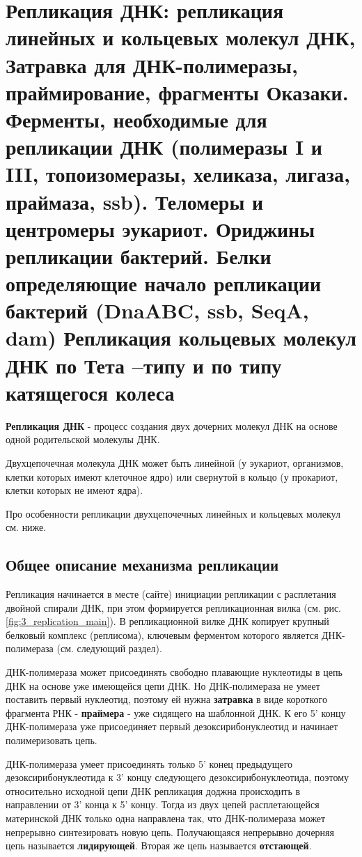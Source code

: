 \section{Репликация ДНК: репликация линейных и кольцевых молекул ДНК, 
Затравка для ДНК-полимеразы, праймирование, фрагменты Оказаки. 
Ферменты, необходимые для репликации ДНК (полимеразы I и III, топоизомеразы, хеликаза, лигаза, 
праймаза, ssb). 
Теломеры и центромеры эукариот. Ориджины репликации бактерий. Белки определяющие начало 
репликации бактерий (DnaABC, ssb, SeqA, dam) Репликация кольцевых молекул ДНК по Тета –типу и по типу катящегося колеса}


\textbf{Репликация ДНК} - процесс создания двух дочерних молекул ДНК на основе одной родительской молекулы ДНК. 

Двухцепочечная молекула ДНК может быть линейной (у эукариот, организмов, клетки которых имеют  клеточное ядро) или свернутой в кольцо (у прокариот, клетки которых не имеют ядра). 

Про особенности репликации двухцепочечных линейных и кольцевых молекул см. ниже.

\subsection{Общее описание механизма репликации}
Репликация начинается в месте (сайте) инициации репликации с расплетания двойной спирали ДНК, при этом формируется репликационная вилка (см. рис. \ref{fig:3_replication_main}). В репликационной вилке ДНК копирует крупный белковый комплекс (реплисома), ключевым ферментом которого является ДНК-полимераза (см. следующий раздел).

ДНК-полимераза может присоединять свободно плавающие нуклеотиды в цепь ДНК на основе уже имеющейся цепи ДНК. Но ДНК-полимераза не умеет поставить первый нуклеотид, поэтому ей нужна \textbf{затравка} в виде короткого фрагмента РНК - \textbf{праймера} - уже сидящего на шаблонной ДНК. К его 5' концу ДНК-полимераза уже присоединяет первый дезоксирибонуклеотид и начинает полимеризовать цепь.

ДНК-полимераза умеет присоединять только 5' конец предыдущего дезоксирибонуклеотида к 3' концу следующего дезоксирибонуклеотида, поэтому относительно исходной цепи ДНК репликация доджна происходить в направлении от 3' конца к 5' концу. Тогда из двух цепей расплетающейся материнской ДНК только одна направлена так, что ДНК-полимераза может непрерывно синтезировать новую цепь. Получающаяся непрерывно дочерняя цепь  называется \textbf{лидирующей}. Вторая же цепь называется \textbf{отстающей}. 

